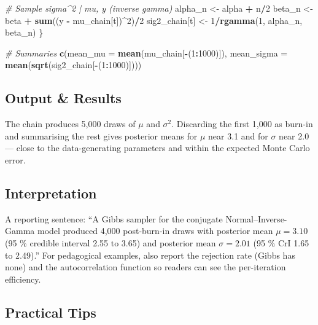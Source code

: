\documentclass[
]{article}
\newenvironment{Shaded}{\begin{snugshade}}{\end{snugshade}}
\newcommand{\AttributeTok}[1]{\textcolor[rgb]{0.13,0.29,0.53}{#1}}
\newcommand{\CommentTok}[1]{\textcolor[rgb]{0.56,0.35,0.01}{\textit{#1}}}
\newcommand{\DecValTok}[1]{\textcolor[rgb]{0.00,0.00,0.81}{#1}}
\newcommand{\FunctionTok}[1]{\textcolor[rgb]{0.13,0.29,0.53}{\textbf{#1}}}
\newcommand{\NormalTok}[1]{#1}
\newcommand{\OtherTok}[1]{\textcolor[rgb]{0.56,0.35,0.01}{#1}}
\newcommand{\SpecialCharTok}[1]{\textcolor[rgb]{0.81,0.36,0.00}{\textbf{#1}}}
\begin{document}
\begin{Shaded}
\begin{Highlighting}[]
  \CommentTok{\# Sample sigma\^{}2 | mu, y  (inverse gamma)}
\NormalTok{  alpha\_n }\OtherTok{\textless{}{-}}\NormalTok{ alpha }\SpecialCharTok{+}\NormalTok{ n}\SpecialCharTok{/}\DecValTok{2}
\NormalTok{  beta\_n  }\OtherTok{\textless{}{-}}\NormalTok{ beta }\SpecialCharTok{+} \FunctionTok{sum}\NormalTok{((y }\SpecialCharTok{{-}}\NormalTok{ mu\_chain[t])}\SpecialCharTok{\^{}}\DecValTok{2}\NormalTok{)}\SpecialCharTok{/}\DecValTok{2}
\NormalTok{  sig2\_chain[t] }\OtherTok{\textless{}{-}} \DecValTok{1}\SpecialCharTok{/}\FunctionTok{rgamma}\NormalTok{(}\DecValTok{1}\NormalTok{, alpha\_n, beta\_n)}
\NormalTok{\}}

\CommentTok{\# Summaries}
\FunctionTok{c}\NormalTok{(}\AttributeTok{mean\_mu =} \FunctionTok{mean}\NormalTok{(mu\_chain[}\SpecialCharTok{{-}}\NormalTok{(}\DecValTok{1}\SpecialCharTok{:}\DecValTok{1000}\NormalTok{)]),}
  \AttributeTok{mean\_sigma =} \FunctionTok{mean}\NormalTok{(}\FunctionTok{sqrt}\NormalTok{(sig2\_chain[}\SpecialCharTok{{-}}\NormalTok{(}\DecValTok{1}\SpecialCharTok{:}\DecValTok{1000}\NormalTok{)])))}
\end{Highlighting}
\end{Shaded}

\subsection{Output \& Results}\label{output-results}

The chain produces 5,000 draws of \(\mu\) and \(\sigma^2\). Discarding
the first 1,000 as burn-in and summarising the rest gives posterior
means for \(\mu\) near 3.1 and for \(\sigma\) near 2.0 --- close to the
data-generating parameters and within the expected Monte Carlo error.

\subsection{Interpretation}\label{interpretation}

A reporting sentence: ``A Gibbs sampler for the conjugate
Normal--Inverse-Gamma model produced 4,000 post-burn-in draws with
posterior mean \(\mu = 3.10\) (95 \% credible interval 2.55 to 3.65) and
posterior mean \(\sigma = 2.01\) (95 \% CrI 1.65 to 2.49).'' For
pedagogical examples, also report the rejection rate (Gibbs has none)
and the autocorrelation function so readers can see the per-iteration
efficiency.

\subsection{Practical Tips}\label{practical-tips}
\end{document}
